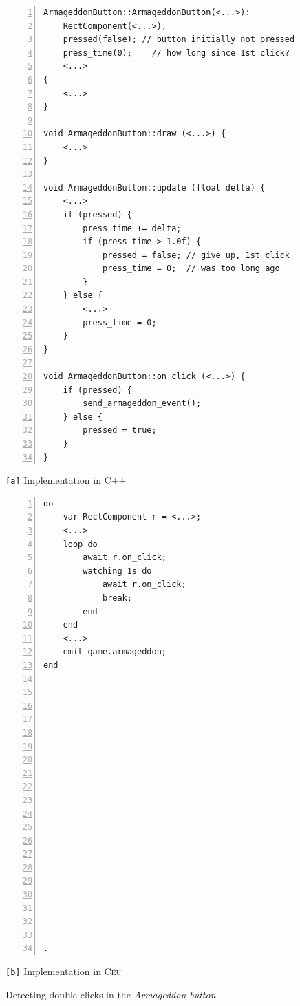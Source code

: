 \documentclass{vgtc}                          %
\newcommand{\CEU}{\textsc{C\'{e}u}\xspace}
\newcommand{\code}[1] {{\small{\texttt{#1}}}}
\newcommand{\ax}{\code{[a]}\xspace}
\newcommand{\bx}{\code{[b]}\xspace}
\begin{document}
\begin{figure}[t]
\begin{minipage}[t]{0.55\linewidth}
\begin{lstlisting}[numbers=left,xleftmargin=3em]
ArmageddonButton::ArmageddonButton(<...>):
    RectComponent(<...>),
    pressed(false); // button initially not pressed
    press_time(0);    // how long since 1st click?
    <...>
{
    <...>
}

void ArmageddonButton::draw (<...>) {
    <...>
}

void ArmageddonButton::update (float delta) {
    <...>
    if (pressed) {
        press_time += delta;
        if (press_time > 1.0f) {
            pressed = false; // give up, 1st click
            press_time = 0;  // was too long ago
        }
    } else {
        <...>
        press_time = 0;
    }
}

void ArmageddonButton::on_click (<...>) {
    if (pressed) {
        send_armageddon_event();
    } else {
        pressed = true;
    }
}
\end{lstlisting}
\centering\small{\ax Implementation in C++}
\end{minipage}
%
\begin{minipage}[t]{0.45\linewidth}
\begin{lstlisting}[numbers=left,xleftmargin=3em]
do
    var RectComponent r = <...>;
    <...>
    loop do
        await r.on_click;
        watching 1s do
            await r.on_click;
            break;
        end
    end
    <...>
    emit game.armageddon;
end




















.
\end{lstlisting}
\centering\small{\bx Implementation in \CEU}
\end{minipage}
\caption{ Detecting double-clicks in the \emph{Armageddon button}.
\label{lst.armageddon}
}
\end{figure}
\end{document}
